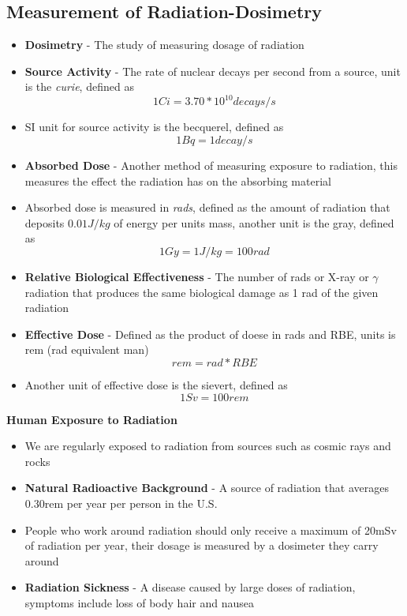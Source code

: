 \subsection{Measurement of Radiation-Dosimetry}
\begin{itemize}
    \item \textbf{Dosimetry} - The study of measuring dosage of radiation
    \item \textbf{Source Activity} - The rate of nuclear decays per second from a source, unit is the \emph{curie}, defined as \[1Ci=3.70*10^{10}decays/s\]
    \item SI unit for source activity is the becquerel, defined as \[1Bq=1decay/s\]
    \item \textbf{Absorbed Dose} - Another method of measuring exposure to radiation, this measures the effect the radiation has on the absorbing material
    \item Absorbed dose is measured in \emph{rads}, defined as the amount of radiation that deposits \(0.01J/kg\) of energy per units mass, another unit is the gray, defined as \[1Gy=1J/kg=100rad\]
    \item \textbf{Relative Biological Effectiveness} - The number of rads or X-ray or \(\gamma\) radiation that produces the same biological damage as 1 rad of the given radiation
    \item \textbf{Effective Dose} - Defined as the product of doese in rads and RBE, units is rem (rad equivalent man) \[rem=rad*RBE\]
    \item Another unit of effective dose is the sievert, defined as \[1Sv=100rem\]
\end{itemize}

\textbf{Human Exposure to Radiation}
\begin{itemize}
    \item We are regularly exposed to radiation from sources such as cosmic rays and rocks
    \item \textbf{Natural Radioactive Background} - A source of radiation that averages 0.30rem per year per person in the U.S.
    \item People who work around radiation should only receive a maximum of 20mSv of radiation per year, their dosage is measured by a dosimeter they carry around
    \item \textbf{Radiation Sickness} - A disease caused by large doses of radiation, symptoms include loss of body hair and nausea
\end{itemize}

